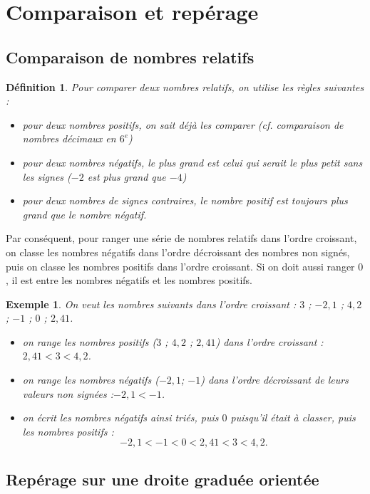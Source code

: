 \documentclass[12 pt]{article}
\theoremstyle{plain}
\newcounter{n}
\numberwithin{n}{section}
\newtheorem*{df}{Définition}
\newtheorem*{ex}{Exemple}
\begin{document}
\section{Comparaison et repérage}

\subsection{Comparaison de nombres relatifs}

\begin{df}
Pour comparer deux nombres relatifs, on utilise les règles suivantes : 
\begin{itemize}
\item pour deux nombres positifs, on sait déjà les comparer (cf. comparaison de nombres décimaux en $6^e$)
\item pour deux nombres négatifs, le plus grand est celui qui serait le plus petit sans les signes ($-2$ est plus grand 
que $-4$)
\item pour deux nombres de signes contraires, le nombre positif est toujours plus grand que le nombre négatif.
\end{itemize}
\end{df}

Par conséquent, pour ranger une série de nombres relatifs dans l'ordre croissant, on classe les 
nombres négatifs dans l'ordre décroissant des nombres non signés, puis on classe les 
nombres positifs
dans l'ordre croissant. Si on doit aussi ranger $0$, il est entre les nombres négatifs et les nombres positifs. 

\begin{ex}
On veut les nombres suivants dans l'ordre croissant :  $3$ ; $-2,1$ ; $4,2$  ; $-1$ ; $0$ ; $2,41$.

\begin{itemize}
\item on range les nombres positifs ($3$ ; $4,2$ ; $2,41$) dans l'ordre croissant : $2,41  < 3 < 4,2$. 
\item on range les nombres négatifs ($-2,1$; $-1$) dans l'ordre décroissant de leurs valeurs non signées :$ -2,1 < 
-1$.
\item on écrit les nombres négatifs ainsi triés, puis $0$ puisqu'il était à classer, puis les 
nombres positifs : \[ -2,1 < -1  < 0 < 2,41 < 3 < 4,2.\]
\end{itemize}
\end{ex}

\subsection{Repérage sur une droite graduée orientée}
\end{document}
